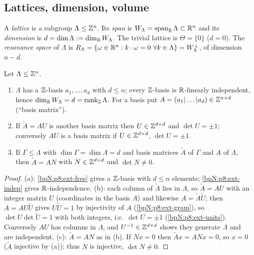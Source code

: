 \subsection{Lattices, dimension, volume}\label{bpN:p8:s-volume}

\begin{definition}[Lattices]\label{bpN:p8:lattice}
A \emph{lattice} is a subgroup $\Lambda\le\mathbb{Z}^n$. Its \emph{span} is $W_\Lambda=\operatorname{span}_{\mathbb{R}}\Lambda\subset\mathbb{R}^n$ and its \emph{dimension} is $d=\dim\Lambda:=\dim_{\mathbb{R}} W_\Lambda$. The trivial lattice is $\Theta=\{0\}$ ($d=0$). The \emph{resonance space} of $\Lambda$ is $R_\Lambda=\{\omega\in\R^n:k\cdot\omega=0\ \forall k\in\Lambda\}=W_\Lambda^\perp$, of dimension $n-d$.
\end{definition}

\begin{lemma}\label{bpN:p8:lattice-basis}
Let $\Lambda\le\mathbb{Z}^n$.
\begin{enumerate}[label=(\alph*)]
\item $\Lambda$ has a $\mathbb{Z}$-basis $a_1,\dots,a_d$ with $d\le n$; every $\mathbb{Z}$-basis is $\mathbb{R}$-linearly independent, hence $\dim_{\mathbb{R}} W_\Lambda=d=\operatorname{rank}_{\mathbb{Z}}\Lambda$. For a basis put $A=(a_1|\dots|a_d)\in\mathbb{Z}^{n\times d}$ (``basis matrix'').
\item If $\tilde A=AU$ is another basis matrix then $U\in\mathbb{Z}^{d\times d}$ and $\det U=\pm1$; conversely $AU$ is a basis matrix if $U\in\mathbb{Z}^{d\times d}$, $\det U=\pm1$.
\item If $\Gamma\le\Lambda$ with $\dim\Gamma=\dim\Lambda=d$ and basis matrices $\tilde A$ of $\Gamma$ and $A$ of $\Lambda$, then $\tilde A=AN$ with $N\in\mathbb{Z}^{d\times d}$ and $\det N\ne0$.
\end{enumerate}
\end{lemma}
\begin{proof}
\label{stepN:p8:lb-basis} (a): \ref{bpN:p8:ext-free} gives a $\mathbb{Z}$-basis with $d\le n$ elements; \ref{bpN:p8:ext-indep} gives $\mathbb{R}$-independence.
\label{stepN:p8:lb-unimod} (b): each column of $\tilde A$ lies in $\Lambda$, so $\tilde A=AU$ with an integer matrix $U$ (coordinates in the basis $A$) and likewise $A=\tilde A\tilde U$; then $A=AU\tilde U$ gives $U\tilde U=1$ by injectivity of $A$ (\ref{bpN:p8:ext-gram}), so $\det U\det\tilde U=1$ with both integers, i.e.\ $\det U=\pm1$ (\ref{bpN:p8:ext-units}). Conversely $AU$ has columns in $\Lambda$, and $U^{-1}\in\mathbb{Z}^{d\times d}$ shows they generate $\Lambda$ and are independent.
\label{stepN:p8:lb-sub} (c): $\tilde A=AN$ as in (b). If $Nx=0$ then $\tilde Ax=ANx=0$, so $x=0$ ($\tilde A$ injective by (a)); thus $N$ is injective, $\det N\ne0$.
\end{proof}

